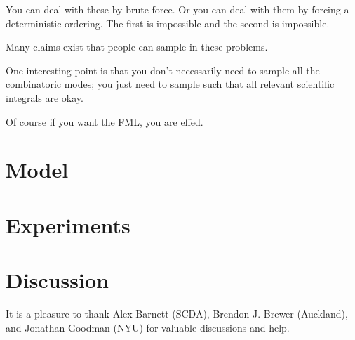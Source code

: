 \documentclass[12pt, preprint]{aastex}
\begin{document}
You can deal with these by brute force.  Or you can deal with them by
forcing a deterministic ordering.  The first is impossible and the
second is impossible.

Many claims exist that people can sample in these problems.

One interesting point is that you don't necessarily need to sample all
the combinatoric modes; you just need to sample such that all relevant
scientific integrals are okay.

Of course if you want the FML, you are effed.

\section{Model}

\section{Experiments}

\section{Discussion}

\acknowledgments
It is a pleasure to thank
  Alex Barnett (SCDA),
  Brendon J. Brewer (Auckland),
  and
  Jonathan Goodman (NYU)
for valuable discussions and help.
\end{document}
